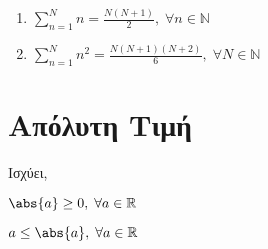 \documentclass[main.tex]{subfiles}
\begin{document}
\begin{example}
\item {}
    \begin{enumerate}[wide,labelwidth=!,labelindent=0pt]
        \item $ \sum_{n=1}^{N} n = \frac{N(N+1)}{2}, \; \forall n \in \mathbb{N}  $
        \item $ \sum_{n=1}^{N} n^{2} = \frac{N(N+1)(N+2)}{6}, \; \forall N \in 
            \mathbb{N} $
    \end{enumerate}
\end{example}

\section{Απόλυτη Τιμή}


\begin{rem}
    Ισχύει, 
    \begin{myitemize}
        \item  $ \abs{a} \geq 0, \;  \forall a \in \mathbb{R} $
        \item $ a \leq \abs{a}, \; \forall a \in \mathbb{R} $
    \end{myitemize}
\end{rem}

\end{document}
